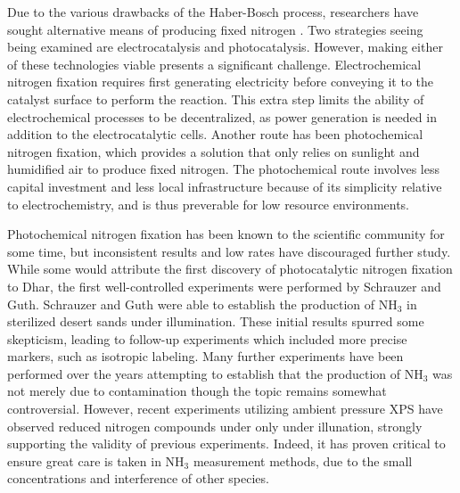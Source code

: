\documentclass[catalysts,article,submit,moreauthors,pdftex,10pt,a4paper]{mdpi}
\theoremstyle{mdpi}
\newcounter{ex}
\newcounter{re}
\theoremstyle{mdpidefinition}
\begin{document}
Due to the various drawbacks of the Haber-Bosch process, researchers have sought alternative means of producing fixed nitrogen \cite{Comer_2019, McPherson_2019,WANG20181055, Kyriakou_2017}. Two strategies seeing being examined are electrocatalysis\cite{McPherson_2019} and photocatalysis\cite{Medford_2017}. However, making either of these technologies viable presents a significant challenge. Electrochemical nitrogen fixation requires first generating electricity before conveying it to the catalyst surface to perform the reaction.\cite{kyriakou_2017} This extra step limits the ability of electrochemical processes to be decentralized, as power generation is needed in addition to the electrocatalytic cells. Another route has been photochemical nitrogen fixation, which provides a solution that only relies on sunlight and humidified air to produce fixed nitrogen. The photochemical route involves less capital investment and less local infrastructure because of its simplicity relative to electrochemistry, and is thus preverable for low resource environments.

Photochemical nitrogen fixation has been known to the scientific community for some time, but inconsistent results and low rates have discouraged further study.\cite{Medford_2017} While some would attribute the first discovery of photocatalytic nitrogen fixation to Dhar,\cite{Dhar_1941} the first well-controlled experiments were performed by Schrauzer and Guth.\cite{Schrauzer_1977} Schrauzer and Guth were able to establish the production of NH$_3$ in sterilized desert sands under illumination. These initial results spurred some skepticism, leading to follow-up experiments which included more precise markers, such as isotropic labeling.\cite{Schrauzer_1983} Many further experiments have been performed over the years attempting to establish that the production of NH$_3$ was not merely due to contamination\cite{Bickley_1979,Augugliaro_1982,Soria_1991,Li_2018,Yuan_2013,Hirakawa_2017} though the topic remains somewhat controversial. However, recent experiments utilizing ambient pressure XPS have observed reduced nitrogen compounds under only under illunation, strongly supporting the validity of previous experiments.\cite{Comer_2018b} Indeed, it has proven critical to ensure great care is taken in NH$_3$ measurement methods, due to the small concentrations and interference of other species.\cite{Gao_2018,Cui2018}

\end{document}

